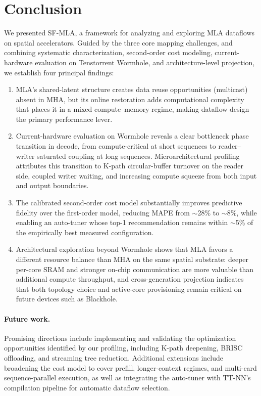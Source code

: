 \documentclass[sigconf, review, anonymous]{acmart}
\newcommand{\brand}{SF-MLA}
\newcommand{\sysname}{\textsc{\brand}\xspace}
\newcommand{\phaseTransition}{phase transition}
\newcommand{\autoTuner}{auto-tuner}
\begin{document}
\section{Conclusion}\label{sec:conclusion}

We presented \sysname, a framework for analyzing and exploring MLA
dataflows on spatial accelerators.  Guided by the three core mapping
challenges, and combining systematic characterization, second-order cost
modeling, current-hardware evaluation on Tenstorrent Wormhole, and
architecture-level projection, we establish four principal findings:

\begin{enumerate}
  \item MLA's shared-latent structure creates data reuse opportunities
    (multicast) absent in MHA, but its online restoration adds
    computational complexity that places it in a mixed
    compute--memory regime, making dataflow design the primary
    performance lever.

  \item Current-hardware evaluation on Wormhole reveals a clear
    bottleneck \phaseTransition{} in decode, from compute-critical at
    short sequences to reader--writer saturated coupling at long
    sequences.  Microarchitectural profiling attributes this transition
    to K-path circular-buffer turnover on the reader side, coupled
    writer waiting, and increasing compute squeeze from both input and
    output boundaries.

  \item The calibrated second-order cost model substantially improves
    predictive fidelity over the first-order model, reducing MAPE from
    $\sim$28\% to $\sim$8\%, while enabling an \autoTuner{} whose top-1
    recommendation remains within $\sim$5\% of the empirically best
    measured configuration.

  \item Architectural exploration beyond Wormhole shows that MLA favors
    a different resource balance than MHA on the same spatial
    substrate: deeper per-core SRAM and stronger on-chip communication
    are more valuable than additional compute throughput, and
    cross-generation projection indicates that both topology choice and
    active-core provisioning remain critical on future devices such as
    Blackhole.
\end{enumerate}

\paragraph{Future work.}
Promising directions include implementing and validating the
optimization opportunities identified by our profiling, including
K-path deepening, BRISC offloading, and streaming tree reduction.
Additional extensions include broadening the cost model to cover
prefill, longer-context regimes, and multi-card sequence-parallel
execution, as well as integrating the \autoTuner{} with TT-NN's
compilation pipeline for automatic dataflow selection.
\end{document}
